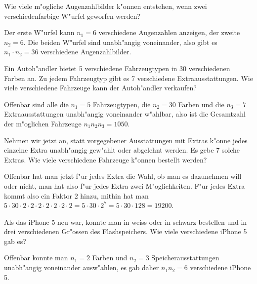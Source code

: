 \begin{beispiele}
\item Wie viele m"ogliche Augenzahlbilder k"onnen entstehen, wenn zwei
verschiedenfarbige W"urfel geworfen werden?

\begin{loesung}
Der erste W"urfel kann $n_1=6$ verschiedene Augenzahlen anzeigen,
der zweite $n_2=6$.
Die beiden W"urfel sind unabh"angig voneinander,
also gibt es $n_1\cdot n_2=36$ verschiedene Augenzahlbilder.
\end{loesung}

\item Ein Autoh"andler bietet 5 verschiedene Fahrzeugtypen in 30
verschiedenen Farben an.
Zu jedem Fahrzeugtyp gibt es 7 verschiedene Extraausstattungen.
Wie viele verschiedene Fahrzeuge kann der Autoh"andler verkaufen?

\begin{loesung}
Offenbar sind alle die $n_1=5$ Fahrzeugtypen, die $n_2=30$ Farben
und die $n_3=7$ Extraausstattungen unabh"angig voneinander w"ahlbar, also ist
die Gesamtzahl der m"oglichen Fahrzeuge $n_1n_2n_3=1050$.
\end{loesung}

\item Nehmen wir jetzt an, statt vorgegebener Ausstattungen mit
Extras k"onne jedes einzelne Extra unabh"angig gew"ahlt oder
abgelehnt werden.
Es gebe 7 solche Extras.
Wie viele verschiedene Fahrzeuge k"onnen bestellt werden?

\begin{loesung}
Offenbar hat man jetzt f"ur jedes Extra die Wahl, ob man es dazunehmen
will oder nicht, man hat also f"ur jedes Extra zwei M"oglichkeiten.
F"ur jedes Extra kommt also ein Faktor $2$ hinzu, mithin hat man
$5\cdot 30
\cdot 2
\cdot 2
\cdot 2
\cdot 2
\cdot 2
\cdot 2
\cdot 2
=5\cdot 30\cdot 2^7=5\cdot 30 \cdot 128=19200$.
\end{loesung}

\item Als das iPhone 5 neu war, konnte man in weiss oder in schwarz
bestellen und in drei verschiedenen
Gr"ossen des Flashspeichers.
Wie viele verschiedene iPhone 5 gab es?

\begin{loesung}
Offenbar konnte man $n_1=2$ Farben und $n_2=3$ Speicherausstattungen
unabh"angig voneinander ausw"ah\-len, es gab
daher $n_1n_2=6$ verschiedene iPhone 5.
\end{loesung}

\end{beispiele}

